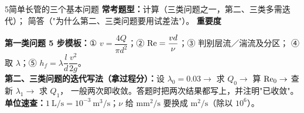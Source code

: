 \begin{kaodian}{5}{简单长管的三个基本问题}
\textbf{常考题型：}计算（三类问题之一，第二、三类多需迭代）；
简答（"为什么第二、三类问题要用试差法"）。
\textbf{重要度 }\quad{}\quad{}

\begin{banfa}
\textbf{第一类问题 5 步模板：}① $v=\dfrac{4Q}{\pi d^2}$；② $\mathrm{Re}=\dfrac{vd}{\nu}$；③ 判别层流／湍流及分区；
④ 取 $\lambda$；⑤ $h_f=\lambda\dfrac{l}{d}\dfrac{v^2}{2g}$。\\
\textbf{第二、三类问题的迭代写法（拿过程分）：}设 $\lambda_0=0.03\to$ 求 $Q_0\to$ 算 $\mathrm{Re}_0\to$ 查新 $\lambda_1\to$ 求 $Q_1$，
一般两次即收敛。答题时把两次结果都写上，并注明"已收敛"。\\
\textbf{单位速查：}$1\ \mathrm{L/s}=10^{-3}\ \mathrm{m^3/s}$；$\nu$ 给 $\mathrm{mm^2/s}$ 要换成 $\mathrm{m^2/s}$（除以 $10^6$）。
\end{banfa}
\end{kaodian}

